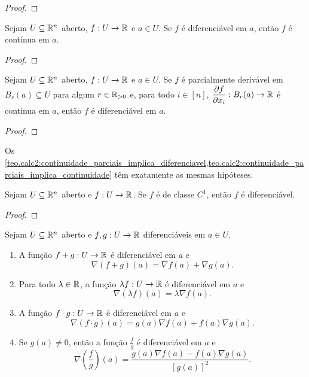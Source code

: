 \begin{proof}
    \blackproof
\end{proof}

\begin{theorem}
    Sejam $U \subseteq \mathbb{R}^n$ aberto, $f : U \to \mathbb{R}$ e $a \in U$. Se $f$ é diferenciável em $a$, então $f$ é contínua em $a$.
\end{theorem}

\begin{proof}
    \blackproof
\end{proof}

\begin{theorem} \label{teo.calc2:continuidade_parciais_implica_diferenciavel}
    Sejam $U \subseteq \mathbb{R}^n$ aberto, $f : U \to \mathbb{R}$ e $a \in U$. Se $f$ é parcialmente derivável em $B_r(a) \subseteq U$ para algum $r \in \mathbb{R}_{>0}$ e, para todo $i \in [n]$, $\dfrac{\partial f}{\partial x_i} : B_r(a) \to \mathbb{R}$ é contínua em $a$, então $f$ é diferenciável em $a$.
\end{theorem}

\begin{proof}
    \blackproof
\end{proof}

\begin{remark}
    Os \cref{teo.calc2:continuidade_parciais_implica_diferenciavel,teo.calc2:continuidade_parciais_implica_continuidade} têm exatamente as mesmas hipóteses.
\end{remark}

\begin{corollary}
    Sejam $U \subseteq \mathbb{R}^n$ aberto e $f : U \to \mathbb{R}$. Se $f$ é de classe $C^1$, então $f$ é diferenciável.
\end{corollary}

\begin{proof}
    \blackproof
\end{proof}

\begin{proposition}
    Sejam $U \subseteq \mathbb{R}^n$ aberto e $f,g : U \to \mathbb{R}$ diferenciáveis em $a \in U$.
        \begin{enumerate}[leftmargin=*, align=left, label=\textbf{(\alph*)}]
            \item A função $f + g : U \to \mathbb{R}$ é diferenciável em $a$ e
                \[
                    \nabla(f+g)(a) = \nabla f(a) + \nabla g(a).
                \]
            \item Para todo $\lambda \in \mathbb{R}$, a função $\lambda f : U \to \mathbb{R}$ é diferenciável em $a$ e
                \[
                    \nabla (\lambda f) (a) = \lambda \nabla f(a).
                \]
            \item A função $f \cdot g : U \to \mathbb{R}$ é diferenciável em $a$ e
                \[
                    \nabla(f \cdot g)(a) = g(a) \nabla f(a) + f(a) \nabla g(a).
                \]
            \item Se $g(a) \neq 0$, então a função $\frac{f}{g}$ é diferenciável em $a$ e
                \[
                    \nabla \left( \dfrac{f}{g}\right)(a) = \dfrac{g(a) \nabla f(a) - f(a) \nabla g(a)}{[g(a)]^2}.
                \]
        \end{enumerate}
\end{proposition}

